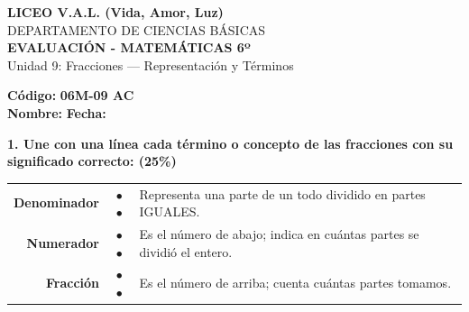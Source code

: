 \documentclass[12pt, letterpaper]{article}
\begin{document}
	
	\begin{center}
		{\Large \textbf{LICEO V.A.L. (Vida, Amor, Luz)}}\\[0.1cm]
		{\large DEPARTAMENTO DE CIENCIAS BÁSICAS}\\[0.1cm]
		\textbf{EVALUACIÓN - MATEMÁTICAS 6º}\\[0.1cm]
		Unidad 9: Fracciones — Representación y Términos
	\end{center}
	
	
	\hfill \textbf{Código:} \textbf{06M-09 AC}\\
	
	\noindent \textbf{Nombre:} \underline{\hspace{8cm}} \hspace{1cm}\textbf{Fecha:} \underline{\hspace{3cm}}
	
	\vspace{0.6cm}
	
	\noindent \textbf{1. Une con una línea cada término o concepto de las fracciones con su significado correcto: \hfill(25\%)}
	
	\begin{center}
		\renewcommand{\arraystretch}{2}
		\begin{tabular}{r c m{10cm}} %
			\textbf{\Large Denominador} & \hspace{0.5cm} $\bullet$ \hspace{1.5cm} $\bullet$ \hspace{0.5cm} & \large Representa una parte de un todo dividido en partes IGUALES.\\[0.2cm]
			\textbf{\Large Numerador}   & \hspace{0.5cm} $\bullet$ \hspace{1.5cm} $\bullet$ \hspace{0.5cm} & \large Es el número de abajo; indica en cuántas partes se dividió el entero.\\[0.2cm]
			\textbf{\Large Fracción}    & \hspace{0.5cm} $\bullet$ \hspace{1.5cm} $\bullet$ \hspace{0.5cm} & \large Es el número de arriba; cuenta cuántas partes tomamos.
		\end{tabular}
	\end{center}
	
	\vspace{0.6cm}
	
\end{document}
